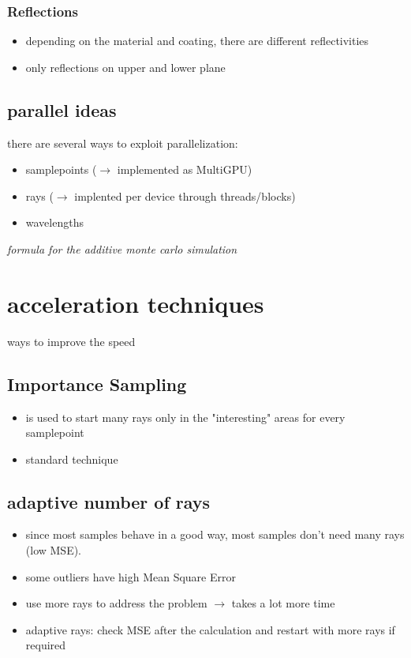 \documentclass[a4paper,11pt]{article}
\begin{document}
\subsubsection{Reflections}
\begin{itemize}
  \item depending on the material and coating, there are different reflectivities
  \item only reflections on upper and lower plane
\end{itemize}

\subsection{parallel ideas}
there are several ways to exploit parallelization:
\begin{itemize}
  \item samplepoints ($\rightarrow$ implemented as MultiGPU)
  \item rays ($\rightarrow$ implented per device through threads/blocks)
  \item wavelengths
\end{itemize}
\textit{formula for the additive monte carlo simulation}


\section{acceleration techniques}
ways to improve the speed
\subsection{Importance Sampling}
\begin{itemize}
  \item is used to start many rays only in the "interesting" areas for every samplepoint
  \item standard technique
\end{itemize}

\subsection{adaptive number of rays}
\begin{itemize}
  \item since most samples behave in a good way, most samples don't need many rays (low MSE).
  \item some outliers have high Mean Square Error
  \item use more rays to address the problem $\rightarrow$ takes a lot more time
  \item adaptive rays: check MSE after the calculation and restart with more rays if required
\end{itemize}
\end{document}
